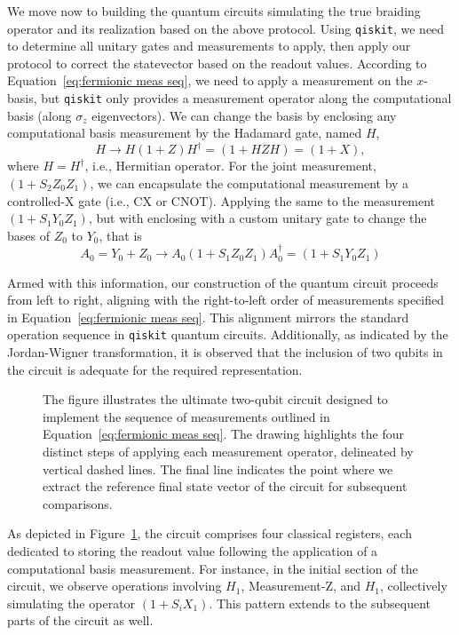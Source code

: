 \documentclass{article}
\begin{document}
\vspace{12pt}
We move now to building the quantum circuits simulating the true braiding operator and its realization based on the above protocol. Using \texttt{qiskit}, we need to determine all unitary gates and measurements to apply, then apply our protocol to correct the statevector based on the readout values. According to Equation~\ref{eq:fermionic meas seq}, we need to apply a measurement on the $ x $-basis, but \texttt{qiskit} only provides a measurement operator along the computational basis (along $ \sigma_z $ eigenvectors). We can change the basis by enclosing any computational basis measurement by the Hadamard gate, named $ H $,
\[
	H \rightarrow H (1 + Z) H^\dagger = (1 + HZH) = (1 + X),
\]
where $ H = H^\dagger $, i.e., Hermitian operator. For the joint measurement, $ (1 + S_2 Z_0 Z_1) $, we can encapsulate the computational measurement by a controlled-X gate (i.e., CX or CNOT). Applying the same to the measurement $ (1 + S_1 Y_0 Z_1) $, but with enclosing with a custom unitary gate to change the bases of $ Z_0 $ to $ Y_0 $, that is
\[
	A_0 = Y_0 + Z_0 \rightarrow A_0(1 + S_1 Z_0 Z_1)A_0^\dagger = (1 + S_1 Y_0 Z_1)
\]

Armed with this information, our construction of the quantum circuit proceeds from left to right, aligning with the right-to-left order of measurements specified in Equation~\ref{eq:fermionic meas seq}. This alignment mirrors the standard operation sequence in \texttt{qiskit} quantum circuits. Additionally, as indicated by the Jordan-Wigner transformation, it is observed that the inclusion of two qubits in the circuit is adequate for the required representation.
\begin{figure}
	\begin{center}
		
	\end{center}
	\caption{The figure illustrates the ultimate two-qubit circuit designed to implement the sequence of measurements outlined in Equation~\ref{eq:fermionic meas seq}. The drawing highlights the four distinct steps of applying each measurement operator, delineated by vertical dashed lines. The final line indicates the point where we extract the reference final state vector of the circuit for subsequent comparisons.}\label{fig:meas q circuit}
\end{figure}
As depicted in Figure~\ref{fig:meas q circuit}, the circuit comprises four classical registers, each dedicated to storing the readout value following the application of a computational basis measurement. For instance, in the initial section of the circuit, we observe operations involving \(H_1\), Measurement-Z, and \(H_1\), collectively simulating the operator \((1 + S_i X_1)\). This pattern extends to the subsequent parts of the circuit as well.
\end{document}

